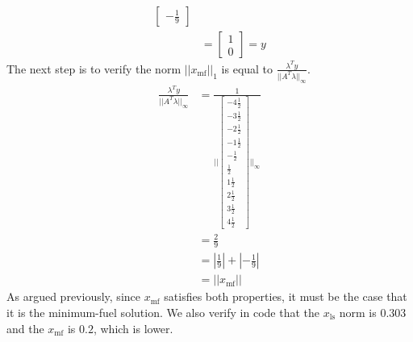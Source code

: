 \documentclass[12pt]{exam}
\begin{document}
\begin{questions}
\begin{solution}
\begin{align*}
\begin{bmatrix}
          -\frac{1}{9}
        \end{bmatrix} \\
        &=
          \begin{bmatrix}
            1 \\
            0
          \end{bmatrix} = y
    \end{align*}
    The next step is to verify the norm $||x_{\text{mf}}||_1$ is equal to $\frac{\lambda^T y}{||A^T\lambda ||_{\infty}}$. 
    \begin{align*}
      \frac{\lambda^T y}{||A^T\lambda ||_{\infty} } &= \frac{1}{||
        \begin{bmatrix}
          -4\frac{1}{2} \\
          -3\frac{1}{2} \\
          -2\frac{1}{2} \\
          -1\frac{1}{2} \\
          -\frac{1}{2} \\
          \frac{1}{2} \\
          1\frac{1}{2} \\
          2\frac{1}{2} \\
          3\frac{1}{2} \\
          4\frac{1}{2}
        \end{bmatrix}||_{\infty}} \\
        &= \frac{2}{9} \\
        &= |\frac{1}{9}| + |-\frac{1}{9}| \\
        &=||x_{\text{mf}}||
    \end{align*}
    As argued previously, since $x_{\text{mf}}$ satisfies both properties, it must be the case that it is the minimum-fuel solution.  We also verify in code that the $x_{\text{ls}}$ norm is $0.303$ and the $x_{\text{mf}}$ is $0.2$, which is lower.


\end{solution}
\end{questions}
\end{document}
